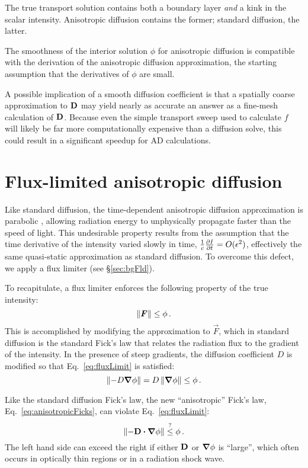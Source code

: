 The true transport solution contains both a boundary layer \emph{and} a kink in
the scalar intensity. Anisotropic diffusion contains the former; standard
diffusion, the latter.

The smoothness of the interior solution $\phi$ for anisotropic diffusion is
compatible with the derivation of the anisotropic diffusion approximation, the
starting assumption that the derivatives of $\phi$ are small.

A possible implication of a smooth diffusion coefficient is that a spatially
coarse approximation to $\mathbf{D}$ may yield nearly as accurate an answer as a
fine-mesh calculation of $\mathbf{D}$. Because even the simple transport sweep used
to calculate $f$ will likely be far more computationally expensive than a
diffusion solve, this could result in a significant speedup for AD calculations.

\section{Flux-limited anisotropic diffusion}

Like standard diffusion, the time-dependent anisotropic diffusion approximation
is parabolic \cite{Pom1982,Ols2000}, allowing radiation energy to unphysically
propagate faster than the speed of light.  This undesirable property results
from the assumption that the time derivative of the intensity varied slowly in
time, $\frac{1}{c}\frac{\partial I}{\partial t} = O(\epsilon^2)$, effectively the same
quasi-static approximation as standard diffusion. To overcome this defect, we
apply a flux limiter (see \S\ref{sec:bgFld}).

To recapitulate, a flux limiter enforces the following property
of the true intensity:
\begin{equation}\label{eq:fluxLimit}
  \left\| \bm{F} \right\| \le \phi\,.
\end{equation}
This is accomplished by modifying the approximation to $\vec{F}$, which in
standard diffusion is the standard Fick's law that relates the radiation flux to
the gradient of the intensity. In the presence of steep gradients, the diffusion
coefficient $D$ is modified so that Eq.~\eqref{eq:fluxLimit} is satisfied:
\begin{equation*}
  \left\| - D \bm{\nabla} \phi \right\| = D \left\| \bm{\nabla} \phi \right\| \le \phi \,.
\end{equation*}

Like the standard diffusion Fick's law, the new ``anisotropic'' Fick's law,
Eq.~\eqref{eq:anisotropicFicks}, can violate Eq.~\eqref{eq:fluxLimit}:
\begin{equation*}
  \left\| - \mathbf{D} \bm{\cdot} \bm{\nabla} \phi \right\| \stackrel{?}{\le} \phi \,.
\end{equation*}
The left hand side can exceed the right if either $\mathbf{D}$ or $\bm{\nabla} \phi$ is
``large'', which often occurs in optically thin regions or in a radiation shock
wave.


